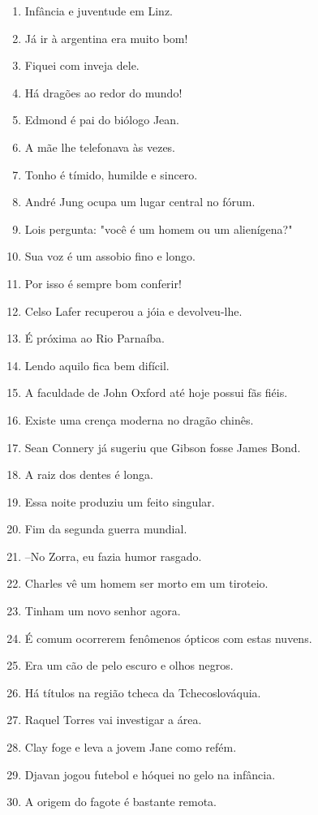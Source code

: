 \begin{enumerate}
\item Inf\^ancia e juventude em Linz.
\item J\'a ir \`a argentina era muito bom!
\item Fiquei com inveja dele.
\item H\'a drag\~oes ao redor do mundo!
\item Edmond \'e pai do bi\'ologo Jean.
\item A m\~ae lhe telefonava \`as vezes.
\item Tonho \'e t\'imido, humilde e sincero.
\item Andr\'e Jung ocupa um lugar central no f\'orum.
\item Lois pergunta: "voc\^e \'e um homem ou um alien\'igena?"
\item Sua voz \'e um assobio fino e longo.
\item Por isso \'e sempre bom conferir!
\item Celso Lafer recuperou a j\'oia e devolveu-lhe.
\item \'E pr\'oxima ao Rio Parna\'iba.
\item Lendo aquilo fica bem dif\'icil.
\item A faculdade de John Oxford at\'e hoje possui f\~as fi\'eis.
\item Existe uma cren\c{c}a moderna no drag\~ao chin\^es.
\item Sean Connery j\'a sugeriu que Gibson fosse James Bond.
\item A raiz dos dentes \'e longa.
\item Essa noite produziu um feito singular.
\item Fim da segunda guerra mundial.
\item --No Zorra, eu fazia humor rasgado.
\item Charles v\^e um homem ser morto em um tiroteio.
\item Tinham um novo senhor agora.
\item \'E comum ocorrerem fen\^omenos \'opticos com estas nuvens.
\item Era um c\~ao de pelo escuro e olhos negros.
\item H\'a t\'itulos na regi\~ao tcheca da Tchecoslov\'aquia.
\item Raquel Torres vai investigar a \'area.
\item Clay foge e leva a jovem Jane como ref\'em.
\item Djavan jogou futebol e h\'oquei no gelo na inf\^ancia.
\item A origem do fagote \'e bastante remota.

\end{enumerate}
